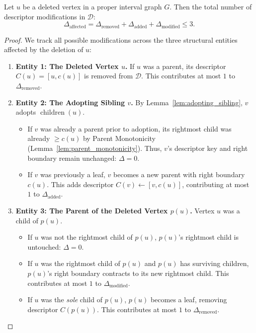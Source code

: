\begin{theorem}
\label{thm:decremental-update}
Let $u$ be a deleted vertex in a proper interval graph $G$. Then the total number of descriptor modifications in $\mathcal{D}$:
\begin{equation}
    \Delta_{\text{affected}} = \Delta_{\text{removed}} + \Delta_{\text{added}} + \Delta_{\text{modified}} \le 3.
\end{equation}
\end{theorem}
\begin{proof}
We track all possible modifications across the three structural entities affected by the deletion of $u$:

\begin{enumerate}
    \item \textbf{Entity 1: The Deleted Vertex $u$.}
    If $u$ was a parent, its descriptor $C(u) = [u, c(u)]$ is removed from $\mathcal{D}$. This contributes at most $1$ to $\Delta_{\text{removed}}$.
    
    \item \textbf{Entity 2: The Adopting Sibling $v$.}
    By Lemma~\ref{lem:adopting_sibling}, $v$ adopts $\operatorname{children}(u)$. 
    \begin{itemize}
        \item If $v$ was already a parent prior to adoption, its rightmost child was already $\ge c(u)$ by Parent Monotonicity (Lemma~\ref{lem:parent_monotonicity}). Thus, $v$'s descriptor key and right boundary remain unchanged: $\Delta = 0$.
        \item If $v$ was previously a leaf, $v$ becomes a new parent with right boundary $c(u)$. This adds descriptor $C(v) \leftarrow [v, c(u)]$, contributing at most $1$ to $\Delta_{\text{added}}$.
    \end{itemize}
    
    \item \textbf{Entity 3: The Parent of the Deleted Vertex $p(u)$.}
    Vertex $u$ was a child of $p(u)$.
    \begin{itemize}
        \item If $u$ was not the rightmost child of $p(u)$, $p(u)$'s rightmost child is untouched: $\Delta = 0$.
        \item If $u$ was the rightmost child of $p(u)$ and $p(u)$ has surviving children, $p(u)$'s right boundary contracts to its new rightmost child. This contributes at most $1$ to $\Delta_{\text{modified}}$.
        \item If $u$ was the \emph{sole} child of $p(u)$, $p(u)$ becomes a leaf, removing descriptor $C(p(u))$. This contributes at most $1$ to $\Delta_{\text{removed}}$.
    \end{itemize}
\end{enumerate}


\end{proof}
